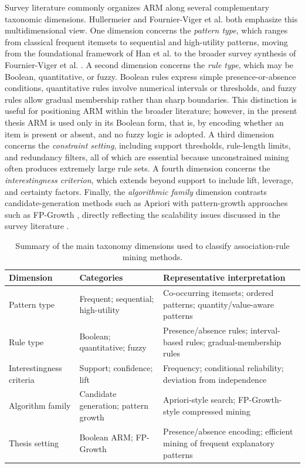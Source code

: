 Survey literature commonly organizes ARM along several complementary taxonomic dimensions. Hullermeier \cite{hullermeier2006association} and Fournier-Viger et al. \cite{fournierviger2017survey} both emphasize this multidimensional view. One dimension concerns the \emph{pattern type}, which ranges from classical frequent itemsets to sequential and high-utility patterns, moving from the foundational framework of Han et al. \cite{han2000mining} to the broader survey synthesis of Fournier-Viger et al. \cite{fournierviger2017survey}. A second dimension concerns the \emph{rule type}, which may be Boolean, quantitative, or fuzzy. Boolean rules express simple presence-or-absence conditions, quantitative rules involve numerical intervals or thresholds, and fuzzy rules allow gradual membership rather than sharp boundaries. This distinction is useful for positioning ARM within the broader literature; however, in the present thesis ARM is used only in its Boolean form, that is, by encoding whether an item is present or absent, and no fuzzy logic is adopted. A third dimension concerns the \emph{constraint setting}, including support thresholds, rule-length limits, and redundancy filters, all of which are essential because unconstrained mining often produces extremely large rule sets. A fourth dimension concerns the \emph{interestingness criterion}, which extends beyond support to include lift, leverage, and certainty factors. Finally, the \emph{algorithmic family} dimension contrasts candidate-generation methods such as Apriori \cite{agrawal1994fast} with pattern-growth approaches such as FP-Growth \cite{han2000mining}, directly reflecting the scalability issues discussed in the survey literature \cite{fournierviger2017survey}.

\begin{table}[H]
\centering
\renewcommand{\arraystretch}{1.18}
\caption{Summary of the main taxonomy dimensions used to classify association-rule mining methods.}
\label{tab:arm-taxonomy-summary}
\begin{tabular}{>{\raggedright\arraybackslash}p{} >{\raggedright\arraybackslash}p{} >{\raggedright\arraybackslash}p{}}
  \toprule
  \textbf{Dimension} & \textbf{Categories} & \textbf{Representative interpretation} \\
  \midrule
  Pattern type & Frequent; sequential; high-utility & Co-occurring itemsets; ordered patterns; quantity/value-aware patterns \\
  Rule type & Boolean; quantitative; fuzzy & Presence/absence rules; interval-based rules; gradual-membership rules \\
  Interestingness criteria & Support; confidence; lift & Frequency; conditional reliability; deviation from independence \\
  Algorithm family & Candidate generation; pattern growth & Apriori-style search; FP-Growth-style compressed mining \\
  Thesis setting & Boolean ARM; FP-Growth & Presence/absence encoding; efficient mining of frequent explanatory patterns \\
  \bottomrule
\end{tabular}
\renewcommand{\arraystretch}{1.0}
\end{table}

